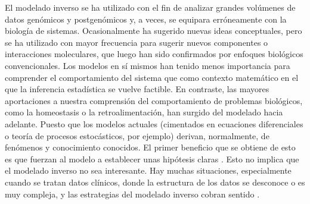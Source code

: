 El modelado inverso se ha utilizado con el fin de analizar grandes volúmenes de datos genómicos y postgenómicos y, a veces, se equipara erróneamente con la biología de sistemas. Ocasionalmente ha sugerido nuevas ideas conceptuales, pero se ha utilizado con mayor frecuencia para sugerir nuevos componentes o interacciones moleculares, que luego han sido confirmados por enfoques biológicos convencionales. Los modelos en sí mismos han tenido menos importancia para comprender el comportamiento del sistema que como contexto matemático en el que la inferencia estadística se vuelve factible. En contraste, las mayores aportaciones a nuestra comprensión del comportamiento de problemas biológicos, como la homeostasis o la retroalimentación, han surgido del modelado hacia adelante. Puesto que los modelos actuales (cimentados en ecuaciones diferenciales o teoría de procesos estocásticos, por ejemplo) derivan, normalmente, de fenómenos y conocimiento conocidos. El primer beneficio que se obtiene de esto es que fuerzan al modelo a establecer unas hipótesis claras \citep{mathsModInmu}. Esto no implica que el modelado inverso no sea interesante. Hay muchas situaciones, especialmente cuando se tratan datos clínicos, donde la estructura de los datos se desconoce o es muy compleja, y las estrategias del modelado inverso cobran sentido \citep{Gunawardena2014}. 


